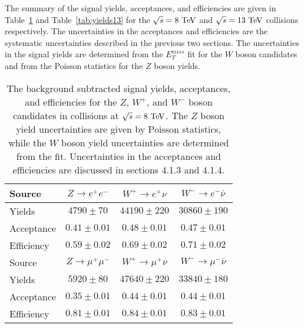 The summary of the signal yields, acceptances, and efficiencies are given in Table~\ref{tab:yields8} and Table~\ref{tab:yields13} for the $\sqrt{s}=8~\mathrm{Te\kern -0.1em V}$ and $\sqrt{s}=13~\mathrm{Te\kern -0.1em V}$ collisions respectively. The uncertainties in the acceptances and efficiencies are the systematic uncertainties described in the previous two sections. The uncertainties in the signal yields are determined from the $E_{T}^{miss}$ fit for the $W$ boson candidates and  from the Poisson statistics for the $Z$ boson yields.   
\def\WEMYIELD{98200 \pm 950}
\def\WEPYIELD{122320 \pm 980}
\def\WMMYIELD{131250 \pm 910}
\def\WMPYIELD{167710 \pm 830}
\def\ZEEYIELD{15290 \pm 120}
\def\ZMMYIELD{23670 \pm 150}
\def\WMPACC{0.44 \pm 0.01 }
\def\WMMACC{0.46 \pm 0.01 }
\def\WMACC{0.45 \pm 0.01 }
\def\ZMMACC{0.36 \pm 0.01 }
\def\WMPEFF{0.78 \pm 0.01 }
\def\WMMEFF{0.79 \pm 0.01 }
\def\WMEFF{0.78 \pm 0.01 }
\def\ZMMEFF{0.80 \pm 0.02 }
\def\WEPACC{0.43 \pm 0.01 }
\def\WEMACC{0.44 \pm 0.01 }
\def\WEACC{0.44 \pm 0.01 }
\def\ZEEACC{0.33 \pm 0.01 }
\def\WEPEFF{0.58 \pm 0.02 }
\def\WEMEFF{0.60 \pm 0.02 }
\def\WEEFF{0.59 \pm 0.02 }
\def\ZEEEFF{0.56 \pm 0.01 }
\begin{table*}[thbp]
\centering
\begin {tabular} {lccc}
\hline
Source     &  $Z\rightarrow e^+e^-$  & $W^{+}\rightarrow e^+\nu$           & $W^{-}\rightarrow e^-\bar{\nu}$            \\
\hline
Yields     & $4790\pm70$ & $44190\pm220$ & $30860\pm190$\\
Acceptance&$0.41\pm0.01$&$0.48\pm0.01$&$0.47\pm0.01$\\
Efficiency&$0.59\pm0.02$&$0.69\pm0.02$&$0.71\pm0.02$\\
  \hline
 Source     &  $Z\rightarrow \mu^+\mu^-$  & $W^{+}\rightarrow \mu^+\nu$           & $W^{-}\rightarrow \mu^-\bar{\nu}$            \\
\hline
Yields    &  $5920\pm80$&$47640\pm220$&$33840\pm180$\\
Acceptance &$0.35\pm0.01$&$0.44\pm0.01$&$0.44\pm0.01$\\
Efficiency &$0.81\pm0.01$&$0.84\pm0.01$&$0.83\pm0.01$\\
\hline
\end{tabular}
\caption{ \label{tab:yields8}
The background subtracted signal yields, acceptances, and efficiencies for the $Z$, $W^+$, and $W^-$ boson candidates in collisions at $\sqrt{s}=8~\mathrm{Te\kern -0.1em V}$. The $Z$ boson yield uncertainties are given by Poisson statistics, while the $W$ boson yield uncertainties are determined from the fit. Uncertainties in the acceptances and efficiencies are discussed in sections 4.1.3 and 4.1.4.}
\end{table*}
